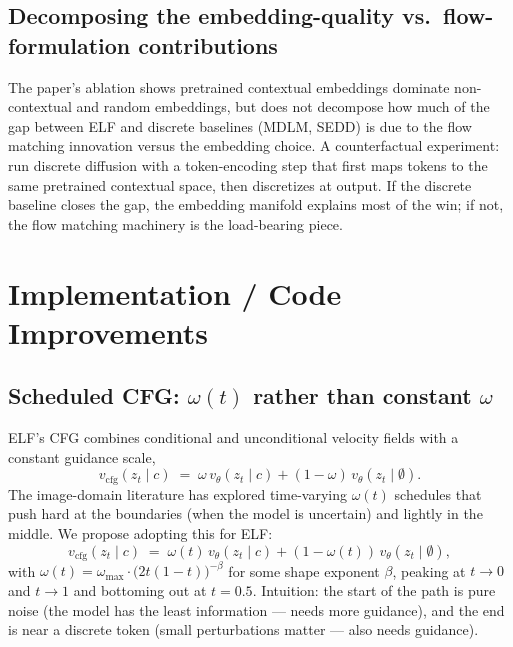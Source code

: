 \documentclass[11pt]{article}
\begin{document}
\subsection*{Decomposing the embedding-quality vs.\ flow-formulation contributions}

The paper's ablation shows pretrained contextual embeddings dominate non-contextual and random embeddings, but does not decompose how much of the gap between ELF and discrete baselines (MDLM, SEDD) is due to the flow matching innovation versus the embedding choice. A counterfactual experiment: run discrete diffusion \citep{sahoo2024mdlm} with a token-encoding step that first maps tokens to the same pretrained contextual space, then discretizes at output. If the discrete baseline closes the gap, the embedding manifold explains most of the win; if not, the flow matching machinery is the load-bearing piece.

\section*{Implementation / Code Improvements}

\subsection*{Scheduled CFG: $\omega(t)$ rather than constant $\omega$}

ELF's CFG combines conditional and unconditional velocity fields with a constant guidance scale,
\begin{equation}
v_\text{cfg}(z_t \mid c) \;=\; \omega \, v_\theta(z_t \mid c) + (1 - \omega) \, v_\theta(z_t \mid \emptyset).
\label{eq:cfg-fixed}
\end{equation}
The image-domain literature has explored time-varying $\omega(t)$ schedules that push hard at the boundaries (when the model is uncertain) and lightly in the middle. We propose adopting this for ELF:
\begin{equation}
v_\text{cfg}(z_t \mid c) \;=\; \omega(t) \, v_\theta(z_t \mid c) + (1 - \omega(t)) \, v_\theta(z_t \mid \emptyset),
\end{equation}
with $\omega(t) = \omega_{\max} \cdot \big(2 t (1-t)\big)^{-\beta}$ for some shape exponent $\beta$, peaking at $t \to 0$ and $t \to 1$ and bottoming out at $t = 0.5$. Intuition: the start of the path is pure noise (the model has the least information --- needs more guidance), and the end is near a discrete token (small perturbations matter --- also needs guidance).
\end{document}
